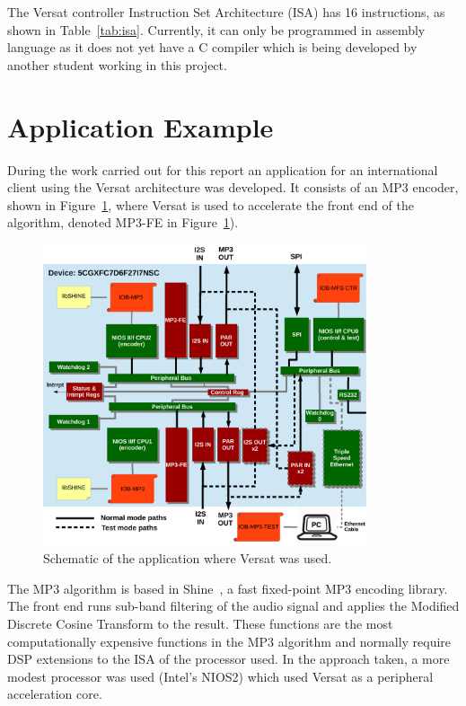 The Versat controller Instruction Set Architecture (ISA) has 16 instructions, as
shown in Table~\ref{tab:isa}. Currently, it can only be programmed in assembly
language as it does not yet have a C compiler which is being developed by
another student working in this project.


\section{Application Example}
\label{section:application}

During the work carried out for this report an application for an international
client using the Versat architecture was developed. It consists of an MP3
encoder, shown in Figure~\ref{fig:application}, where Versat is used to
accelerate the front end of the algorithm, denoted MP3-FE in
Figure~\ref{fig:application}).

\begin{figure}[!htb]
	\centering
	\includegraphics[width=0.85\textwidth]{Figures/bd.pdf}
	\caption{Schematic of the application where Versat was used.}
	\label{fig:application}
\end{figure}

The MP3 algorithm is based in Shine~\cite{shine:mp3}, a fast fixed-point MP3
encoding library. The front end runs sub-band filtering of the audio signal and
applies the Modified Discrete Cosine Transform to the result. These functions
are the most computationally expensive functions in the MP3 algorithm and
normally require DSP extensions to the ISA of the processor used. In the
approach taken, a more modest processor was used (Intel's NIOS2) which used
Versat as a peripheral acceleration core.

